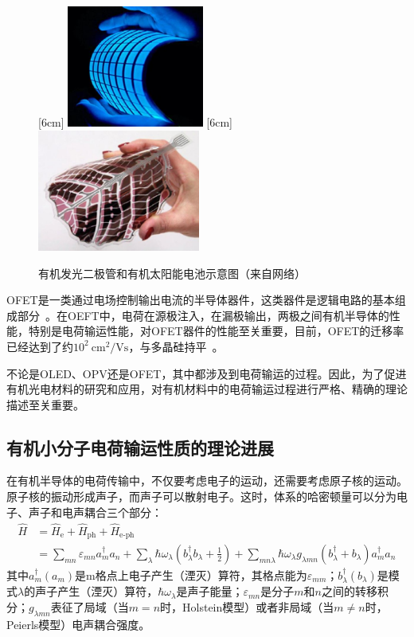 \documentclass{article}
\newcommand{\He}{{\hat H}_{\text{e}}}
\newcommand{\Hph}{{\hat H}_{\text{ph}}}
\newcommand{\Heph}{{\hat H}_{\text{e-ph}}}
\begin{document}
\begin{figure}[ht]
  \centering%
  [6cm] 
    {\includegraphics[height=4cm]{intro-oled}}%
  \hspace{2em}%
  [6cm] 
      {\includegraphics[height=4cm]{intro-opv}}
  \vspace{1em}
  \caption[有机发光二极管和有机太阳能电池示意图]{有机发光二极管和有机太阳能电池示意图（来自网络）}
  \label{fig:intro-intro}
\end{figure}

OFET是一类通过电场控制输出电流的半导体器件，这类器件是逻辑电路的基本组成部分~\cite{WEN11, WANG12,GELINCK10,MUCCINI06}。在OEFT中，电荷在源极注入，在漏极输出，两极之间有机半导体的性能，特别是电荷输运性能，对OFET器件的性能至关重要，目前，OFET的迁移率已经达到了约$10^2 \ \textrm{cm}^2/\textrm{Vs}$，与多晶硅持平~\cite{TSUT16}。

不论是OLED、OPV还是OFET，其中都涉及到电荷输运的过程。因此，为了促进有机光电材料的研究和应用，对有机材料中的电荷输运过程进行严格、精确的理论描述至关重要。

\subsection{有机小分子电荷输运性质的理论进展}

在有机半导体的电荷传输中，不仅要考虑电子的运动，还需要考虑原子核的运动。原子核的振动形成声子，而声子可以散射电子。这时，体系的哈密顿量可以分为电子、声子和电声耦合三个部分：
\begin{equation}
\label{eq:theory-mu-h}
\begin{aligned}
\hat H&= \He+ \Hph + \Heph \\
&=\sum_{mn}\varepsilon_{mn}a_m^\dag a_n+\sum_{\lambda}\hbar\omega_{\lambda}\left(b_{\lambda}^\dag b_{\lambda}+\frac{1}{2} \right ) + \sum_{mn\lambda}\hbar\omega_{\lambda}g_{\lambda mn}\left(b_{\lambda}^\dag + b_{\lambda} \right )a_m^\dag a_n
\end{aligned}
\end{equation}
其中$a_m^\dag(a_m)$是m格点上电子产生（湮灭）算符，其格点能为$\varepsilon_{mm}$；$b_{\lambda}^\dag(b_{\lambda})$是模式$\lambda$的声子产生（湮灭）算符，$\hbar\omega_{\lambda}$是声子能量；$\varepsilon_{mn}$是分子$m$和$n$之间的转移积分；$g_{\lambda mn}$表征了局域（当$m=n$时，Holstein模型）或者非局域（当$m\ne n$时，Peierls模型）电声耦合强度。
\end{document}
